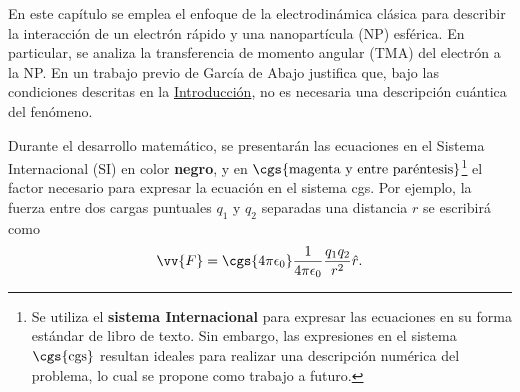 \label{cap: teoria metodos}
En este capítulo se emplea el enfoque de la electrodinámica clásica para describir la interacción de un electrón rápido y una nanopartícula (NP) esférica. En particular, se analiza la transferencia de momento angular (TMA) del electrón a la NP. En un trabajo previo de García de Abajo \cite{deabajo2021optical} justifica que, bajo las condiciones descritas en la \hyperref[cap: introduccion]{Introducción}, no es necesaria una descripción cuántica del fenómeno.

Durante el desarrollo matemático, se presentarán las ecuaciones en el Sistema Internacional (SI) en color \textbf{negro}, y en $\cgs{\text{magenta y entre paréntesis}}$\footnote{Se utiliza el \textbf{sistema Internacional} para expresar las ecuaciones en su forma estándar de libro de texto. Sin embargo, las expresiones en el sistema $\cgs{\text{cgs}}$ resultan ideales para realizar una descripción numérica del problema, lo cual se propone como trabajo a futuro. } el factor necesario para expresar la ecuación en el sistema cgs. Por ejemplo, la fuerza entre dos cargas puntuales $q_1$ y $q_2$ separadas una distancia $r$ se escribirá como
\begin{equation}
\vv{F} = \cgs{4\pi\epsilon_0}\frac{1}{4\pi\epsilon_0} \frac{q_1 q_2}{r^2} \hat{r}.
\end{equation}
%
%
